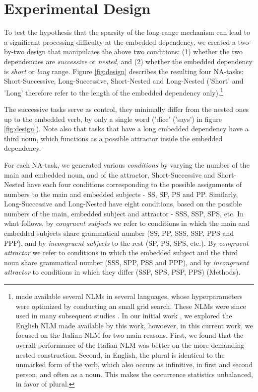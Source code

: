 \section{Experimental Design}
To test the hypothesis that the sparsity of the long-range mechanism can lead to a significant processing difficulty at the embedded dependency, we created a two-by-two design that manipulates the above two conditions: (1) whether the two dependencies are \textit{successive} or \textit{nested}, and (2) whether the embedded dependency is \textit{short} or \textit{long} range. Figure \ref{fig:design} describes the resulting four NA-tasks: Short-Successive, Long-Successive, Short-Nested and Long-Nested ('Short' and 'Long' therefore refer to the length of the embedded dependency only).\footnote{\citet{Gulordava:etal:2018} made available several NLMs in several languages, whose hyperparameters were optimized by conducting an small grid search. 
These NLMs were since used in many subsequent studies \citep{Giulianelli:etal:2018, jumelet2019analysing, wilcox2018rnn, futrell2019neural}.
In our initial work \citep{lakretz2019emergence}, we explored the English NLM made available by this work, howoever, in this current work, we focused on the Italian NLM for two main reasons. First, we found that the overall performance of the Italian NLM was better on the more demanding nested construction. Second, in English, the plural is identical to the unmarked form of the verb, which also occurs as infinitive, in first and second person, and often as a noun. This makes the occurrence statistics unbalanced, in favor of plural.} 

The successive tasks serve as control, they minimally differ from the nested ones up to the embedded verb, by only a single word ('dice' ('says') in figure \ref{fig:design}). Note also that tasks that have a long embedded dependency have a third noun, which functions as a possible attractor inside the embedded dependency.

For each NA-task, we generated various \textit{conditions} by varying the number of the main and embedded noun, and of the attractor, Short-Successive and Short-Nested have each four conditions corresponding to the possible assignments of numbers to the main and embedded subjects - SS, SP, PS and PP. Similarly, Long-Successive and Long-Nested have eight conditions, based on the possible numbers of the main, embedded subject and attractor - SSS, SSP, SPS, etc. In what follows, by \textit{congruent subjects} we refer to conditions in which the main and embedded subjects share grammatical number (SS, PP, SSS, SSP, PPS and PPP), and by \textit{incongruent subjects} to the rest (SP, PS, SPS, etc.). By \textit{congruent attractor} we refer to conditions in which the embedded subject and the third noun share grammatical number (SSS, SPP, PSS and PPP), and by \textit{incongruent attractor} to conditions in which they differ (SSP, SPS, PSP, PPS) (Methods). 

